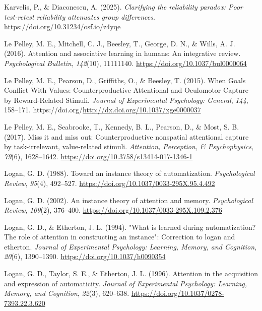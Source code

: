 \documentclass[
  jou,
  floatsintext,
  longtable,
  nolmodern,
  notxfonts,
  notimes,
  colorlinks=true,linkcolor=blue,citecolor=blue,urlcolor=blue]{apa7}
\newlength{\cslhangindent}
\newenvironment{CSLReferences}[2] %
 {\begin{list}{}{%
  \setlength{\itemindent}{0pt}
  \setlength{\leftmargin}{0pt}
  \setlength{\parsep}{0pt}
  \ifodd #1
   \setlength{\leftmargin}{\cslhangindent}
   \setlength{\itemindent}{-1\cslhangindent}
  \fi
  \setlength{\itemsep}{#2\baselineskip}}}
 {\end{list}}
\begin{document}
\begin{CSLReferences}{1}{0}
Karvelis, P., \& Diaconescu, A. (2025). \emph{Clarifying the reliability
paradox: Poor test-retest reliability attenuates group differences}.
\url{https://doi.org/10.31234/osf.io/z4yqe}

Le Pelley, M. E., Mitchell, C. J., Beesley, T., George, D. N., \& Wills,
A. J. (2016). Attention and associative learning in humans: An
integrative review. \emph{Psychological Bulletin}, \emph{142}(10),
11111140. \url{https://doi.org/10.1037/bul0000064}

Le Pelley, M. E., Pearson, D., Griffiths, O., \& Beesley, T. (2015).
When Goals Conflict With Values: Counterproductive Attentional and
Oculomotor Capture by Reward-Related Stimuli. \emph{Journal of
Experimental Psychology: General}, \emph{144}, 158--171.
https://doi.org/\url{http://dx.doi.org/10.1037/xge0000037}

Le Pelley, M. E., Seabrooke, T., Kennedy, B. L., Pearson, D., \& Most,
S. B. (2017). Miss it and miss out: Counterproductive nonspatial
attentional capture by task-irrelevant, value-related stimuli.
\emph{Attention, Perception, \& Psychophysics}, \emph{79}(6),
1628--1642. \url{https://doi.org/10.3758/s13414-017-1346-1}

Logan, G. D. (1988). Toward an instance theory of automatization.
\emph{Psychological Review}, \emph{95}(4), 492--527.
\url{https://doi.org/10.1037/0033-295X.95.4.492}

Logan, G. D. (2002). An instance theory of attention and memory.
\emph{Psychological Review}, \emph{109}(2), 376--400.
\url{https://doi.org/10.1037/0033-295X.109.2.376}

Logan, G. D., \& Etherton, J. L. (1994). {"}What is learned during
automatization? The role of attention in constructing an instance{"}:
Correction to logan and etherton. \emph{Journal of Experimental
Psychology: Learning, Memory, and Cognition}, \emph{20}(6), 1390--1390.
\url{https://doi.org/10.1037/h0090354}

Logan, G. D., Taylor, S. E., \& Etherton, J. L. (1996). Attention in the
acquisition and expression of automaticity. \emph{Journal of
Experimental Psychology: Learning, Memory, and Cognition}, \emph{22}(3),
620--638. \url{https://doi.org/10.1037/0278-7393.22.3.620}


\end{CSLReferences}
\end{document}
